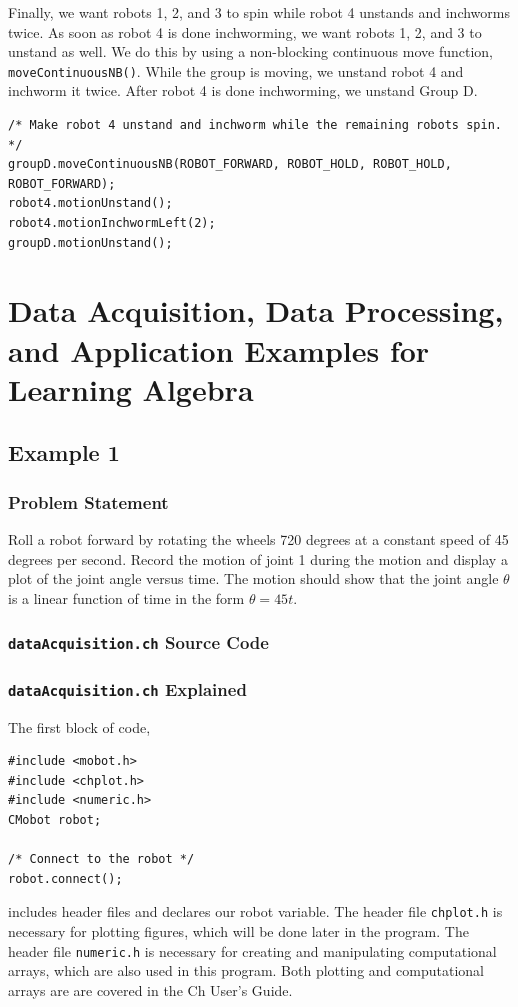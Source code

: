 \documentclass{article}
\begin{document}
Finally, we want robots 1, 2, and 3 to spin while robot 4 unstands and inchworms twice.
As soon as robot 4 is done inchworming, we want robots 1, 2, and 3 to unstand as well.
We do this by using a non-blocking continuous move function, \texttt{moveContinuousNB()}.
While the group is moving, we unstand robot 4 and inchworm it twice. After robot 4 is
done inchworming, we unstand Group D.
\begin{verbatim}
/* Make robot 4 unstand and inchworm while the remaining robots spin. */
groupD.moveContinuousNB(ROBOT_FORWARD, ROBOT_HOLD, ROBOT_HOLD, ROBOT_FORWARD);
robot4.motionUnstand();
robot4.motionInchwormLeft(2);
groupD.motionUnstand();
\end{verbatim}

\section{Data Acquisition, Data Processing, and Application Examples for Learning Algebra}
\subsection{Example 1}
\subsubsection{Problem Statement}
Roll a robot forward by rotating the wheels 720 degrees at a constant speed of 45 degrees per
second. Record the motion of joint 1 during the motion and display a plot
of the joint angle versus time. The motion should show that the joint angle $\theta$
is a linear function of time in the form $\theta = 45t$.

\subsubsection{\texttt{dataAcquisition.ch} Source Code}


\subsubsection{\texttt{dataAcquisition.ch} Explained}
The first block of code,
\begin{verbatim}
#include <mobot.h>
#include <chplot.h>
#include <numeric.h>
CMobot robot;

/* Connect to the robot */
robot.connect();
\end{verbatim}
includes header files and declares our robot variable. The header file
\texttt{chplot.h} is necessary for plotting figures, which will be done later in the
program. The header file \texttt{numeric.h} is necessary for creating and manipulating
computational arrays, which are also used in this program. Both plotting and computational
arrays are are covered in the Ch User's Guide.
\end{document}
